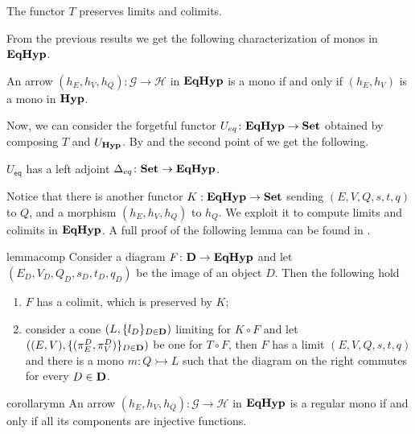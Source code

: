 \documentclass[a4paper,UKenglish,cleveref,pdftex,thm-restate,numberwithinsect]{lipics-v2021}
\newcommand{\eq}{\mathsf{eq}}
\newcommand{\Set}{\mathbf{Set}}
\def\D{\textbf {\textup{D}}}
\newcommand{\catname}[1]{\textbf{\textup{#1}}}
\newcommand{\hyp}{\catname{Hyp}}
\newcommand{\EqHyp}{\catname{EqHyp}} %
\newcommand{\mto}{\rightarrowtail}
\begin{document}
\begin{corollary}\label{cor:limcolim}
	The functor $T$ preserves limits and colimits.
\end{corollary}

From the previous results we get the following characterization of monos in $\EqHyp$.

\begin{corollary}\label{cor:mono1}
	An arrow $(h_E, h_V, h_Q): \mathcal{G \to H}$ in $\EqHyp$ is a mono if and only if $(h_E, h_V)$ is a mono in $\hyp$.
\end{corollary}

Now, we can consider the forgetful functor $U_{\eq}\colon \EqHyp\to \Set$ obtained by composing $T$ and $U_{\hyp}$.  By  and the second point of  we get the following.

\begin{corollary}\label{cor:ladj}
	$U_{\eq}$ has a left adjoint $\Delta_{\eq}\colon \Set \to \EqHyp$.
\end{corollary}

Notice that there is another functor $K: \EqHyp \to \Set$ sending $(E, V, Q, s, t, q)$ to $Q$, and a morphism $(h_E, h_V, h_Q)$ to $h_Q$. We  exploit it to compute limits and colimits in $\EqHyp$. A full proof of the following lemma can be found in .

\noindent
\parbox{11.4cm}{
\begin{restatable}{lemma}{comp}\label{prop:eqhyp_complete}
Consider a diagram $F\colon \D \to \EqHyp$ and let $(E_D, V_D, Q_D, s_D, t_D, q_D)$ be the image of an object $D$. Then the following hold
\begin{enumerate}
		\item $F$ has a colimit, which is preserved by $K$;
	\item consider a cone $(L, \{l_D\}_{D\in \D})$ limiting  for $K \circ F$ and let $((E, V), \{(\pi^D_E, \pi^D_V)\}_{D\in \D})$ be one for $T\circ F$, then $F$ has a limit $(E, V, Q, s, t, q)$ and there is a {\color{red} mono $m\colon Q\mto L$} such that the diagram on the right commutes for every $D\in \D$.
\end{enumerate}
\end{restatable}}\hfill 
\parbox{3cm}{}   

\begin{restatable}{corollary}{mn}\label{cor:mono2}
	An arrow $(h_E, h_V, h_Q): \mathcal{G\to H}$ in $\EqHyp$ is a regular mono if and only if all its components are injective functions.
\end{restatable}
\end{document}
